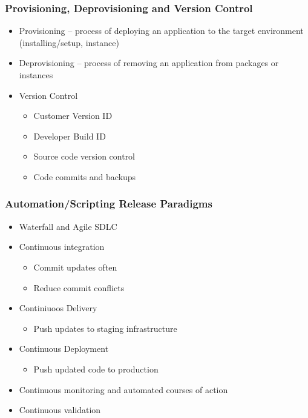 		\subsubsection {Provisioning, Deprovisioning and Version Control}
			\begin{itemize}
				\item Provisioning -- process of deploying an application to the target
					environment (installing/setup, instance)
				\item Deprovisioning -- process of removing an application from packages
					or instances
				\item Version Control
					\begin{itemize}
						\item Customer Version ID
						\item Developer Build ID
						\item Source code version control
						\item Code commits and backups
					\end{itemize}
			\end{itemize}
		\subsubsection {Automation/Scripting Release Paradigms}
			\begin{itemize}
				\item Waterfall and Agile SDLC
				\item Continuous integration
					\begin{itemize}
						\item Commit updates often
						\item Reduce commit conflicts
					\end{itemize}
				\item Continiuoos Delivery
					\begin{itemize}
						\item Push updates to staging infrastructure
					\end{itemize}
				\item Continuous Deployment
					\begin{itemize}
						\item Push updated code to production
					\end{itemize}
				\item Continuous monitoring and automated courses of action
				\item Continuous validation
			\end{itemize}
